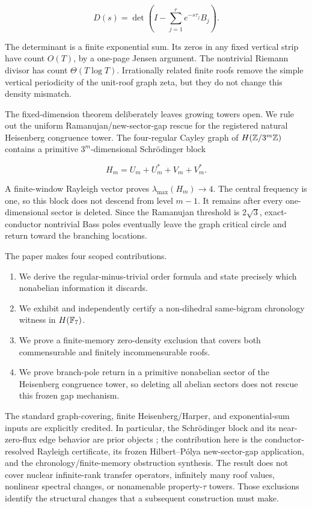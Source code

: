 \[
D(s)=\det\!\left(I-\sum_{j=1}^{r}e^{-s\tau_j}B_j\right).
\]

The determinant is a finite exponential sum. Its zeros in any fixed vertical
strip have count \(O(T)\), by a one-page Jensen argument. The nontrivial
Riemann divisor has count \(\Theta(T\log T)\). Irrationally related finite
roofs remove the simple vertical periodicity of the unit-roof graph zeta, but
they do not change this density mismatch.

The fixed-dimension theorem deliberately leaves growing towers open. We rule
out the uniform Ramanujan/new-sector-gap rescue for the registered natural
Heisenberg congruence tower. The
four-regular Cayley graph of \(H(\mathbb{Z}/3^m\mathbb{Z})\) contains a primitive
\(3^m\)-dimensional Schrödinger block

\[
H_m=U_m+U_m^*+V_m+V_m^*.
\]

A finite-window Rayleigh vector proves
\(\lambda_{\max}(H_m)\to4\). The central frequency is one, so this block does
not descend from level \(m-1\). It remains after every one-dimensional sector
is deleted. Since the Ramanujan threshold is \(2\sqrt3\), exact-conductor
nontrivial Bass poles eventually leave the graph critical circle and return
toward the branching locations.

The paper makes four scoped contributions.

\begin{enumerate}[leftmargin=2em]
  \item We derive the regular-minus-trivial order formula and state precisely
  which nonabelian information it discards.
  \item We exhibit and independently certify a non-dihedral same-bigram
  chronology witness in \(H(\mathbb{F}_7)\).
  \item We prove a finite-memory zero-density exclusion that covers both
  commensurable and finitely incommensurable roofs.
  \item We prove branch-pole return in a primitive nonabelian sector of the
  Heisenberg congruence tower, so deleting all abelian sectors does not rescue
  this frozen gap mechanism.
\end{enumerate}

The standard graph-covering, finite Heisenberg/Harper, and exponential-sum
inputs are explicitly credited. In particular, the Schrödinger block and its
near-zero-flux edge behavior are prior objects
\citep{dedeo2003spectra,beguin1997harper}; the contribution here is the
conductor-resolved Rayleigh certificate, its frozen Hilbert--Pólya
new-sector-gap application, and the chronology/finite-memory obstruction
synthesis. The result does not cover nuclear infinite-rank
transfer operators, infinitely many roof values, nonlinear spectral changes,
or nonamenable property-\(\tau\) towers. Those exclusions identify the
structural changes that a subsequent construction must make.
